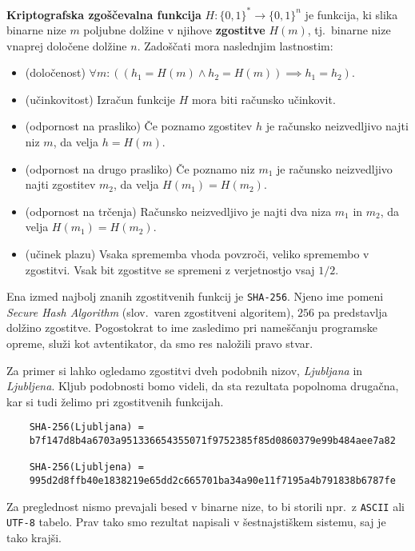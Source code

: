 \documentclass[isrm2, tisk]{fmfdelo}
\begin{document}
\begin{definicija} 
\label{def:hash}
    \textbf{Kriptografska zgoščevalna funkcija} $H: \{0, 1\}^* \rightarrow \{0, 1\}^n$ je funkcija, 
    ki slika binarne nize $m$ poljubne dolžine v njihove \textbf{zgostitve} $H(m)$, tj.\ binarne nize 
    vnaprej določene dolžine $n$. Zadoščati mora naslednjim lastnostim:
    \begin{itemize}
        \item (določenost) $\forall m: ((h_1 = H(m) \wedge h_2 = H(m)) \implies h_1 = h_2)$.
        \item (učinkovitost) Izračun funkcije $H$ mora biti računsko učinkovit.
        \item (odpornost na prasliko) Če poznamo zgostitev $h$ je računsko neizvedljivo najti 
            niz $m$, da velja $h = H(m)$.
        \item (odpornost na drugo prasliko) Če poznamo niz $m_1$ je računsko neizvedljivo najti 
            zgostitev $m_2$, da velja $H(m_1) = H(m_2)$.
        \item (odpornost na trčenja) Računsko neizvedljivo je najti dva niza $m_1$ in $m_2$, 
            da velja $H(m_1) = H(m_2)$.
        \item (učinek plazu) Vsaka sprememba vhoda povzroči, veliko spremembo v zgostitvi. 
            Vsak bit zgostitve se spremeni z verjetnostjo vsaj $1/2$.
    \end{itemize}
\end{definicija}

\begin{primer}
    Ena izmed najbolj znanih zgostitvenih funkcij je \texttt{SHA-256}. Njeno ime pomeni \textit{Secure 
    Hash Algorithm} (slov.\ varen zgostitveni algoritem), $256$ pa predstavlja dolžino zgostitve. 
    Pogostokrat to ime zasledimo pri nameščanju programske opreme, služi kot avtentikator, da smo res 
    naložili pravo stvar.

    Za primer si lahko ogledamo zgostitvi dveh podobnih nizov, \textit{Ljubljana} in \textit{Ljubljena}. 
    Kljub podobnosti bomo videli, da sta rezultata popolnoma drugačna, kar si tudi želimo pri zgostitvenih 
    funkcijah.
    \begin{verbatim}
    SHA-256(Ljubljana) =
    b7f147d8b4a6703a951336654355071f9752385f85d0860379e99b484aee7a82

    SHA-256(Ljubljena) =
    995d2d8ffb40e1838219e65dd2c665701ba34a90e11f7195a4b791838b6787fe
    \end{verbatim}
    Za preglednost nismo prevajali besed v binarne nize, to bi storili npr.\ z \texttt{ASCII} ali \texttt{UTF-8}
    tabelo. Prav tako smo rezultat napisali v šestnajstiškem sistemu, saj je tako krajši.
\end{primer}
\end{document}
